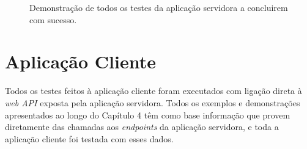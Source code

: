 \begin{figure}[h]
	\begin{center}
	\end{center}
	\caption{Demonstração de todos os testes da aplicação servidora a concluirem com sucesso.}\label{fig:gamessortednameup}
\end{figure}
\newpage
\section{Aplicação Cliente}\label{sec52}
Todos os testes feitos à aplicação cliente foram executados com ligação direta à \textit{web API} exposta pela aplicação servidora. Todos os exemplos e demonstrações apresentados ao longo do Capítulo 4 têm como base informação que provem diretamente das chamadas aos \textit{endpoints} da aplicação servidora, e toda a aplicação cliente foi testada com esses dados.